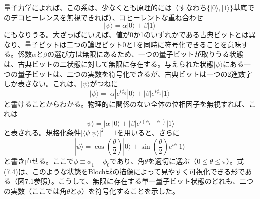 量子力学によれば、この系は、少なくとも原理的には（すなわち$\{|0\rangle,|1\rangle\}$基底でのデコヒーレンスを無視できれば）、コヒーレントな重ね合わせ
\begin{equation}|\psi\rangle=\alpha|0\rangle+\beta|1\rangle\tag{7.1}\end{equation}
にもなりうる。大ざっぱにいえば、値が0か1のいずれかである古典ビットとは異なり、量子ビットは二つの論理ビット0と1を同時に符号化できることを意味する。係数$\alpha$と$\beta$の選び方は無限にあるため、一つの量子ビットが取りうる状態は、古典ビットの二状態に対して無限に存在する。与えられた状態$|\psi\rangle$にある一つの量子ビットは、二つの実数を符号化できるが、古典ビットは一つの2進数字しか表さない。これは、$|\psi\rangle$がつねに
\begin{equation}|\psi\rangle=|\alpha|e^{i\phi_0}|0\rangle+|\beta|e^{i\phi_1}|1\rangle\tag{7.2}\end{equation}
と書けることからわかる。物理的に関係のない全体の位相因子を無視すれば、これは
\begin{equation}|\psi\rangle=|\alpha||0\rangle+|\beta|e^{i(\phi_1-\phi_0)}|1\rangle\tag{7.3}\end{equation}
と表される。規格化条件$|\langle\psi|\psi\rangle|^2=1$を用いると、さらに
\begin{equation}|\psi\rangle=\cos\left(\frac{\theta}{2}\right)|0\rangle+\sin\left(\frac{\theta}{2}\right)e^{i\phi}|1\rangle\tag{7.4}\end{equation}
と書き直せる。ここで$\phi\equiv\phi_1-\phi_0$であり、角$\theta$を適切に選ぶ（$0\leq\theta\leq\pi$）。式(7.4)は、このような状態をBloch球の描像によって見やすく可視化できる形である（図7.1参照）。こうして、無限に存在する単一量子ビット状態のどれも、二つの実数（ここでは角$\theta$と$\phi$）を符号化することを示した。

